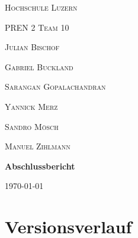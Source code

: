 \documentclass{scrarticle}                %
\begin{document}

\begin{titlepage}
	 \par
	{\scshape\LARGE Hochschule Luzern \par}
	\vspace{1cm}
	{\scshape\Large PREN 2 Team 10\par}
	\vspace{1cm}

	{\scshape\large Julian Bischof\par}
	{\scshape\large Gabriel Buckland\par}
	{\scshape\large Sarangan Gopalachandran \par}
	{\scshape\large Yannick Merz\par}
	{\scshape\large Sandro Mösch\par}
	{\scshape\large Manuel Zihlmann\par}

	\vspace{1.5cm}
	{\huge\bfseries Abschlussbericht \par}

	\vspace{1cm}

	\begin{figure}[H]
		\centering
	\end{figure}

	\vfill
	{\large \today\par}
\end{titlepage}

\newpage


\section*{Versionsverlauf}
\thispagestyle{nofooter}
\end{document}
